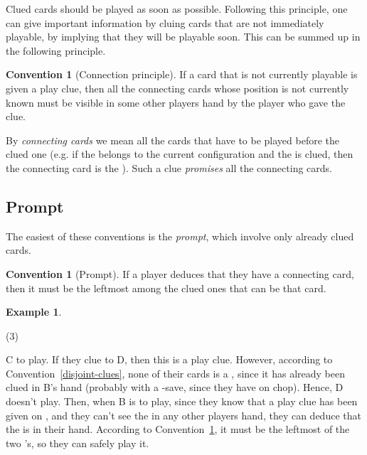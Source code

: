\documentclass[a4paper]{article}
\theoremstyle{plain}
\theoremstyle{definition}
\newtheorem{example}[theorem]{Example}
\newtheorem{convention}[theorem]{Convention}
\begin{document}
Clued cards should be played as soon as possible. Following this principle, one can give important information by cluing cards that are not immediately playable, by implying that they will be playable soon. This can be summed up in the following principle.

\begin{convention}[Connection principle]
	\label{connection-principle}
	If a card that is not currently playable is given a play clue, then all the connecting cards whose position is not currently known must be visible in some other players hand by the player who gave the clue.
\end{convention}

By \textit{connecting cards} we mean all the cards that have to be played before the clued one (e.g. if the  belongs to the current configuration and the  is clued, then the connecting card is the ). Such a clue \emph{promises} all the connecting cards.

\subsection{Prompt}

The easiest of these conventions is the \textit{prompt}, which involve only already clued cards.

\begin{convention}[Prompt]
	\label{prompt}
	If a player deduces that they have a connecting card, then it must be the leftmost among the clued ones that can be that card.
\end{convention}

\begin{example}
	\hfill
	\begin{tasks}(3)
		\task[+]      
		\task[A]    
		\task[B]    
		\task[C]    
		\task[D]    
		\task[E]    
	\end{tasks}
	
	C to play. If they clue  to D, then this is a play clue. However, according to Convention~\ref{disjoint-clues}, none of their cards is a , since it has already been clued in B's hand (probably with a -save, since they have  on chop). Hence, D doesn't play. Then, when B is to play, since they know that a play clue has been given on , and they can't see the  in any other players hand, they can deduce that the  is in their hand. According to Convention~\ref{prompt}, it must be the leftmost of the two 's, so they can safely play it.
\end{example}
\end{document}
